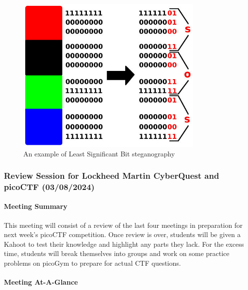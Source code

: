 \documentclass[
  letterpaper,
  DIV=11,
  numbers=noendperiod]{scrartcl}
\let\oldparagraph\paragraph
\renewcommand{\paragraph}[1]{\oldparagraph{#1}\mbox{}}
\begin{document}
\begin{figure}

{\centering \includegraphics[width=3.64583in,height=\textheight]{img/LSB_example.jpg}

}

\caption{An example of Least Significant Bit steganography}

\end{figure}

\hypertarget{review-session-for-lockheed-martin-cyberquest-and-picoctf-03082024}{%
\subsubsection{Review Session for Lockheed Martin CyberQuest and picoCTF
(03/08/2024)}\label{review-session-for-lockheed-martin-cyberquest-and-picoctf-03082024}}

\hypertarget{meeting-summary-17}{%
\paragraph{Meeting Summary}\label{meeting-summary-17}}

This meeting will consist of a review of the last four meetings in
preparation for next week's picoCTF competition. Once review is over,
students will be given a Kahoot to test their knowledge and highlight
any parts they lack. For the excess time, students will break themselves
into groups and work on some practice problems on picoGym to prepare for
actual CTF questions.

\hypertarget{meeting-at-a-glance-17}{%
\paragraph{Meeting At-A-Glance}\label{meeting-at-a-glance-17}}
\end{document}
